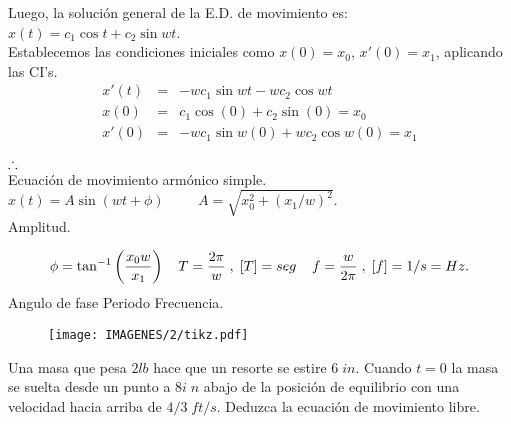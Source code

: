 \documentclass{beamer}
\begin{document}
\begin{frame}[t]
	\begin{block}{}
		Luego, la solución general de la E.D. de movimiento es: \(x(t) = c_1 \cos t + c_2 \sin wt\). \\[2mm]
		Establecemos las condiciones iniciales como \(x(0) = x_0\), \(x' (0) = x_1\), aplicando las CI's.
		\[
			\begin{array}{rcl}
				x' (t) & = & -w c_1 \sin w t -w c_2 \cos w t \\[2mm]
				x(0) & = & c_1 \cos (0)+c_2 \sin (0) = x_0 \\[2mm]
				x'(0) & = & -wc_1 \sin w(0)+wc_2 \cos w(0) = x_1
			\end{array}
		\]
		\begin{center}
			\(\therefore \hspace{5mm}\) \color{red} \\
			\hspace{5mm} \footnotesize Ecuación de movimiento armónico simple. \\[2mm]
			\color{black} \normalsize \(x(t)= A \sin (wt+ \phi ) \hspace{1cm} A = \sqrt{x_0^2+(x_1/w) ^2}\).\\
			\color{red} \hspace{4cm} \footnotesize Amplitud.
		\end{center}
	\end{block}
\end{frame}

\begin{frame}[t]
	\begin{block}{}
		\[
			\phi = \tan ^{-1} \bigg(\dfrac{x_0w}{x_1}\bigg) \hspace{4mm} T = \dfrac{2 \pi}{w} \;,\;  [T] = seg \hspace{4mm} f = \dfrac{w}{2 \pi} \;,\; [f] = 1/s = Hz.
		\]
		\color{red} \hspace{1cm} \footnotesize Angulo de fase \hspace{1.3cm} Periodo \hspace{1.5cm} Frecuencia.
		\begin{figure}[hbt!]
			\centering
			\texttt{[image: IMAGENES/2/tikz.pdf]}
		\end{figure}
	\end{block}
\end{frame}

\begin{frame}[t]
	\begin{example}
		Una masa que pesa \(2lb\) hace que un resorte se estire \(6\;in\).
		Cuando \(t=0\)  la masa se suelta desde un punto a \(8i\;n\) abajo de la posición de equilibrio con una velocidad hacia arriba de \(4/3\;ft/s\).
		Deduzca la ecuación de movimiento libre.
	\end{example}
\end{frame}
\end{document}
